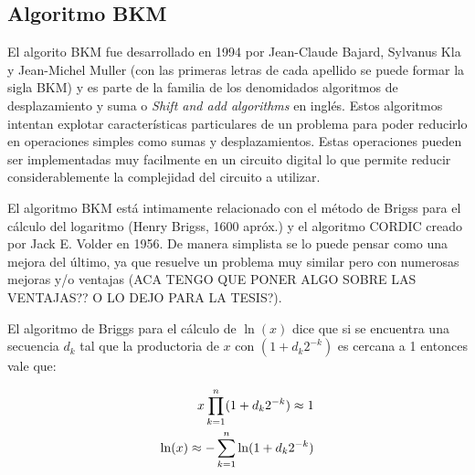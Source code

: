 \documentclass[a4paper]{article}
\begin{document}

\subsection{Algoritmo BKM}

El algorito BKM \cite{BKM} fue desarrollado en 1994 por Jean-Claude Bajard, Sylvanus Kla y Jean-Michel Muller (con las primeras letras de cada apellido se puede formar la sigla BKM) y es parte de la familia de los denomidados algoritmos de desplazamiento y suma o \textit{Shift and add algorithms} en inglés. Estos algoritmos intentan explotar características particulares de un problema para poder reducirlo en operaciones simples como sumas y desplazamientos. Estas operaciones pueden ser implementadas muy facilmente en un circuito digital lo que permite reducir considerablemente la complejidad del circuito a utilizar.

El algoritmo BKM está intimamente relacionado con el método de Brigss para el cálculo del logaritmo (Henry Brigss, 1600 apróx.) y el algoritmo CORDIC \cite{Volder} creado por Jack E. Volder en 1956. De manera simplista se lo puede pensar como una mejora del último, ya que resuelve un problema muy similar pero con numerosas mejoras y/o ventajas (ACA TENGO QUE PONER ALGO SOBRE LAS VENTAJAS?? O LO DEJO PARA LA TESIS?).

El algoritmo de Briggs para el cálculo de $\ln(x)$ dice que si se encuentra una secuencia $d_k$ tal que la productoria de $x$ con $(1+d_k 2^{-k})$ es cercana a 1 entonces vale que:

\begin{equation} \label{eq:briggs_ln}
   \begin{subequations}
      \begin{aligned}
         x \prod_{k=1}^{n} (1+d_k 2^{-k}) \approx 1     \\
         \ln(x) \approx - \sum_{k=1}^{n} \ln(1+d_k 2^{-k})
      \end{aligned}
   \end{subequations}
\end{equation}
\end{document}

